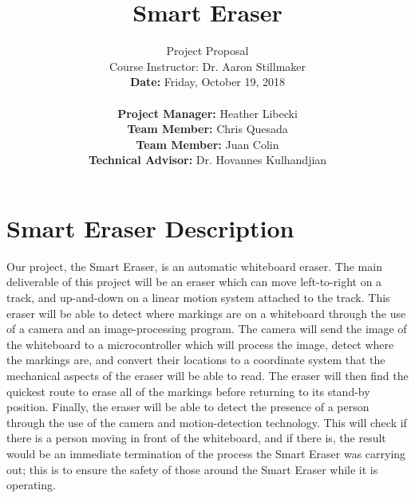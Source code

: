 \documentclass[10pt,onecolumn,draftcls]{IEEEtran} 					%
\title{\vspace{2in}Smart Eraser}	%
\author{Project Proposal \\ 			%
	Course Instructor: Dr. Aaron Stillmaker \\ 				%
	\vspace{12pt} 								%
	\textbf{Date:} Friday, October 19, 2018  \\ 
	\vspace{2in}								%
	\vspace{6pt}
\begin{flushleft}
	\textbf{Project Manager:} Heather Libecki			%
	\vspace{12pt}
	\underline{\hspace{3.77in}}\\					%
	\textbf{Team Member:} Chris Quesada
	\vspace{12pt}
	\underline{\hspace{4in}}\\
	\textbf{Team Member:} Juan Colin
	\vspace{12pt}
	\underline{\hspace{4.25in}}\\
	\textbf{Technical Advisor:} Dr. Hovannes Kulhandjian
	\underline{\hspace{3.05in}} \\
	\end{flushleft}
	\vspace{12in}}								%
\begin{document}
	\thispagestyle{empty}						%
	
	\maketitle									%
	
	
	\section{Smart Eraser Description}
	\setlength{\parindent}{5ex}
	Our project, the Smart Eraser, is an automatic whiteboard eraser. The main deliverable of this project will be an eraser which can move left-to-right on a track, and up-and-down on a linear motion system attached to the track. This eraser will be able to detect where markings are on a whiteboard through the use of a camera and an image-processing program. The camera will send the image of the whiteboard to a microcontroller which will process the image, detect where the markings are, and convert their locations to a coordinate system that the mechanical aspects of the eraser will be able to read. The eraser will then find the quickest route to erase all of the markings before returning to its stand-by position. Finally, the eraser will be able to detect the presence of a person through the use of the camera and motion-detection technology. This will check if there is a person moving in front of the whiteboard, and if there is, the result would be an immediate termination of the process the Smart Eraser was carrying out; this is to ensure the safety of those around the Smart Eraser while it is operating. 
	
\end{document}
